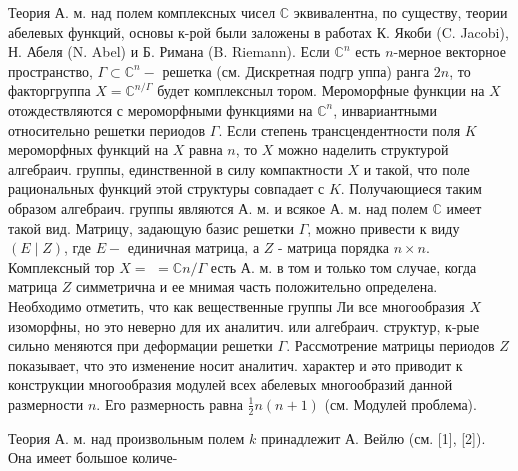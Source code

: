 \documentclass[10pt]{article}
\begin{document}
Теория А. м. над полем комплексных чисел $\mathbb{C}$ эквивалентна, по существу, теории абелевых функций, основы к-рой были заложены в работах К. Якоби (C. Jacobi), Н. Абеля (N. Abel) и Б. Римана (B. Riemann). Если $\mathbb{C}^{n}$ есть $n$-мерное векторное пространство, $\Gamma \subset \mathbb{C}^{n}-$ решетка (см. Дискретная подгр уппа) ранга $2 n$, то факторгруппа $X=\mathbb{C}^{n / \Gamma}$ будет комплексныл тором. Мероморфные функции на $X$ отождествляются с мероморфными функциями на $\mathbb{C}^{n}$, инвариантными относительно решетки периодов $\Gamma$. Если степень трансцендентности поля $K$ мероморфных функций на $X$ равна $n$, то $X$ можно наделить структурой алгебраич. группы, единственной в силу компактности $X$ и такой, что поле рациональных функций этой структуры совпадает с $K$. Получающиеся таким образом алгебраич. группы являются А. м. и всякое А. м. над полем $\mathbb{C}$ имеет такой вид. Матрицу, задающую базис решетки $\Gamma$, можно привести к виду $(E \mid Z)$, где $E-$ единичная матрица, а $Z$ - матрица порядка $n \times n$. Комплексный тор $X=$ $=\mathbb{C} n / \Gamma$ есть А. м. в том и только том случае, когда матрица $Z$ симметрична и ее мнимая часть положительно определена. Необходимо отметить, что как вещественные группы Ли все многообразия $X$ изоморфны, но это неверно для их аналитич. или алгебраич. структур, к-рые сильно меняются при деформации решетки $\Gamma$. Рассмотрение матрицы периодов $Z$ показывает, что это изменение носит аналитич. характер и әто приводит к конструкции многообразия модулей всех абелевых многообразий данной размерности $n$. Его размерность равна $\frac{1}{2} n(n+1)$ (см. Модулей проблема).



Теория А. м. над произвольным полем $k$ принадлежит А. Вейлю (см. [1], [2]). Она имеет большое количе-
\end{document}
